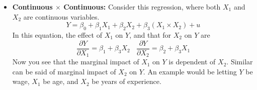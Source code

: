 \documentclass[12pt]{article}
\theoremstyle{definition}
\theoremstyle{property}
\theoremstyle{assumption}
\theoremstyle{example}
\theoremstyle{comment}
\begin{document}
\begin{itemize}
\item \textbf{Continuous $\times$ Continuous: } Consider this regression, where both $X_1$ and $X_2$ are continuous variables. 
\[
Y = \beta_0 + \beta_1X_1 + \beta_2 X_2 + \beta_3 (X_1\times X_2)+u
\] 
In this equation, the effect of $X_1$ on $Y$, and that for $X_2$ on $Y$ are
\[
\frac{\partial Y}{\partial X_1} = \beta_1 + \beta_3 X_2 \ \ \ \ \frac{\partial Y}{\partial X_2} = \beta_2 + \beta_3 X_1 
\]
Now you see that the marginal impact of $X_1$ on $Y$ is dependent of $X_2$. Similar can be said of marginal impact of $X_2$ on $Y$. An example would be letting $Y$ be wage, $X_1$ be age, and $X_2$ be years of experience. \par\medskip
\end{itemize}

\end{document}
